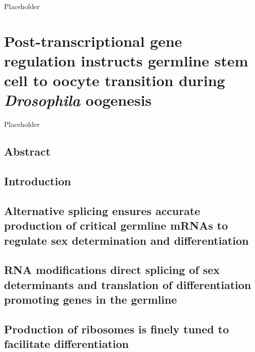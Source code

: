 \documentclass[12pt,oneside]{reedthesis}
\begin{document}
Placeholder

\hypertarget{post-transcriptional-gene-regulation-instructs-germline-stem-cell-to-oocyte-transition-during-drosophila-oogenesis}{%
\chapter{\texorpdfstring{Post-transcriptional gene regulation instructs germline stem cell to oocyte transition during \emph{Drosophila} oogenesis}{Post-transcriptional gene regulation instructs germline stem cell to oocyte transition during Drosophila oogenesis}}\label{post-transcriptional-gene-regulation-instructs-germline-stem-cell-to-oocyte-transition-during-drosophila-oogenesis}}

Placeholder

\hypertarget{abstract}{%
\section{Abstract}\label{abstract}}

\hypertarget{introduction}{%
\section{Introduction}\label{introduction}}

\hypertarget{alternative-splicing-ensures-accurate-production-of-critical-germline-mrnas-to-regulate-sex-determination-and-differentiation}{%
\section{Alternative splicing ensures accurate production of critical germline mRNAs to regulate sex determination and differentiation}\label{alternative-splicing-ensures-accurate-production-of-critical-germline-mrnas-to-regulate-sex-determination-and-differentiation}}

\hypertarget{rna-modifications-direct-splicing-of-sex-determinants-and-translation-of-differentiation-promoting-genes-in-the-germline}{%
\section{RNA modifications direct splicing of sex determinants and translation of differentiation promoting genes in the germline}\label{rna-modifications-direct-splicing-of-sex-determinants-and-translation-of-differentiation-promoting-genes-in-the-germline}}

\hypertarget{production-of-ribosomes-is-finely-tuned-to-facilitate-differentiation}{%
\section{Production of ribosomes is finely tuned to facilitate differentiation}\label{production-of-ribosomes-is-finely-tuned-to-facilitate-differentiation}}
\end{document}
